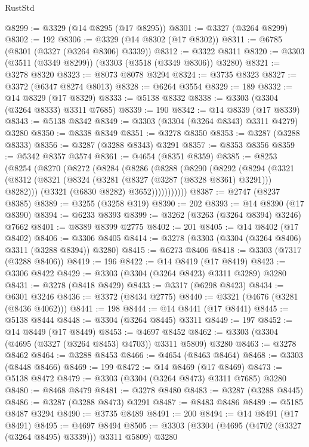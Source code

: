 \begin{lexlean}{RustStd}
\begin{coremodule}
@8299 := @3329 (@14 @8295 (@17 @8295))
@8301 := @3327 (@3264 @8299)
@8302 := 192
@8306 := @3329 (@14 @8302 (@17 @8302))
@8311 := @6785 (@8301 (@3327 (@3264 @8306) @3339))
@8312 := @3322 @8311
@8320 := @3303 (@3511 (@3349 @8299)) (@3303 (@3518 (@3349 @8306)) @3280)
@8321 := @3278 @8320
@8323 := @8073 @8078 @3294
@8324 := @3735 @8323
@8327 := @3372 (@6347 @8274 @8013)
@8328 := @6264 @3554
@8329 := 189
@8332 := @14 @8329 (@17 @8329)
@8333 := @5138 @8332
@8338 := @3303 (@3304 (@3264 @8333) @3311 @7685)
@8339 := 190
@8342 := @14 @8339 (@17 @8339)
@8343 := @5138 @8342
@8349 := @3303 (@3304 (@3264 @8343) @3311 @4279) @3280
@8350 := @8338 @8349
@8351 := @3278 @8350
@8353 := @3287 (@3288 @8333)
@8356 := @3287 (@3288 @8343) @3291
@8357 := @8353 @8356
@8359 := @5342 @8357 @3574
@8361 := @4654 (@8351 @8359)
@8385 := @8253
    (@8254
      (@8270
        (@8272
          (@8284
            (@8286
              (@8288
                (@8290
                  (@8292
                    (@8294
                      (@3321
                        (@8312 (@8321 (@8324 (@3281 (@8327 (@3287 (@8328 @8361) @3291))) @8282)))
                        (@3321 (@6830 @8282) @3652)))))))))))
@8387 := @2747 (@8237 @8385)
@8389 := @3255 (@3258 @319)
@8390 := 202
@8393 := @14 @8390 (@17 @8390)
@8394 := @6233 @8393
@8399 := @3262 (@3263 (@3264 @8394) @3246) @7662
@8401 := @8389 @8399 @2775
@8402 := 201
@8405 := @14 @8402 (@17 @8402)
@8406 := @3306 @8405
@8414 := @3278 (@3303 (@3304 (@3264 @8406) @3311 (@3288 @8394)) @3280)
@8415 := @6273 @8406
@8418 := @3303 (@7317 (@3288 @8406))
@8419 := 196
@8422 := @14 @8419 (@17 @8419)
@8423 := @3306 @8422
@8429 := @3303 (@3304 (@3264 @8423) @3311 @3289) @3280
@8431 := @3278 (@8418 @8429)
@8433 := @3317 (@6298 @8423)
@8434 := @6301 @3246
@8436 := @3372 (@8434 @2775)
@8440 := @3321 (@4676 (@3281 (@8436 @4062)))
@8441 := 198
@8444 := @14 @8441 (@17 @8441)
@8445 := @5138 @8444
@8448 := @3304 (@3264 @8445) @3311
@8449 := 197
@8452 := @14 @8449 (@17 @8449)
@8453 := @4697 @8452
@8462 := @3303 (@3304 (@4695 (@3327 (@3264 @8453) @4703)) @3311 @5809) @3280
@8463 := @3278 @8462
@8464 := @3288 @8453
@8466 := @4654 (@8463 @8464)
@8468 := @3303 (@8448 @8466)
@8469 := 199
@8472 := @14 @8469 (@17 @8469)
@8473 := @5138 @8472
@8479 := @3303 (@3304 (@3264 @8473) @3311 @7685) @3280
@8480 := @8468 @8479
@8481 := @3278 @8480
@8483 := @3287 (@3288 @8445)
@8486 := @3287 (@3288 @8473) @3291
@8487 := @8483 @8486
@8489 := @5185 @8487 @3294
@8490 := @3735 @8489
@8491 := 200
@8494 := @14 @8491 (@17 @8491)
@8495 := @4697 @8494
@8505 := @3303 (@3304 (@4695 (@4702 (@3327 (@3264 @8495) @3339))) @3311 @5809) @3280

\end{coremodule}
\end{lexlean}
